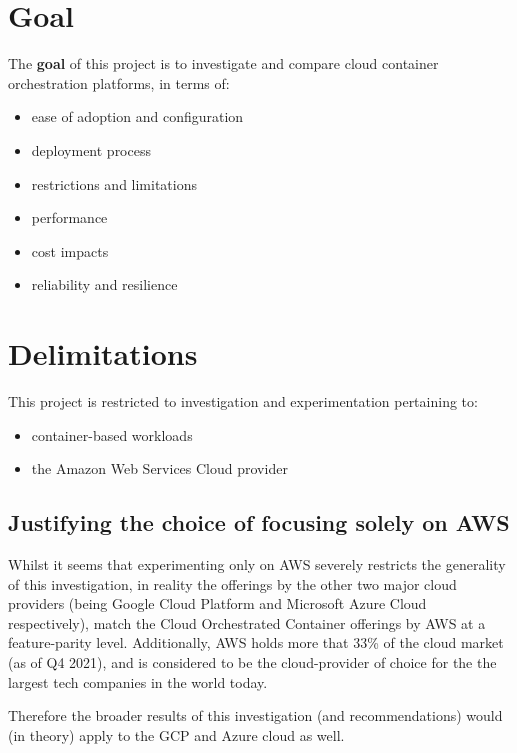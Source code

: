 \section{Goal}
\noindent The \textbf{goal} of this project is to investigate and compare cloud container orchestration platforms, in terms of:
\begin{itemize}
  \item ease of adoption and configuration
  \item deployment process
  \item restrictions and limitations
  \item performance
  \item cost impacts
  \item reliability and resilience
\end{itemize}

\section{Delimitations}
This project is restricted to investigation and experimentation pertaining to:
\begin{itemize}
  \item container-based workloads
  \item the Amazon Web Services Cloud provider
\end{itemize}

\subsection{Justifying the choice of focusing solely on AWS}
Whilst it seems that experimenting only on AWS severely restricts the generality of this investigation, in reality the offerings by the other two major cloud providers
(being Google Cloud Platform and Microsoft Azure Cloud respectively), match the Cloud Orchestrated Container offerings by AWS at a feature-parity level\cite{contaier_workloads}.
Additionally, AWS holds more that 33\% of the cloud market (as of Q4 2021)\cite{aws_cloud_share},
and is considered to be the cloud-provider of choice for the the largest tech companies in the world today\cite{aws_users}.

Therefore the broader results of this investigation (and recommendations) would (in theory) apply to the GCP and Azure cloud as well.

